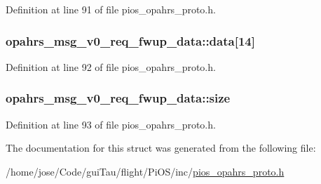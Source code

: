 Definition at line 91 of file pios\-\_\-opahrs\-\_\-proto.\-h.

\hypertarget{structopahrs__msg__v0__req__fwup__data_aed597f47669351e5b689a79755b1f152}{
\subsubsection[{data}]{ opahrs\-\_\-msg\-\_\-v0\-\_\-req\-\_\-fwup\-\_\-data\-::data\mbox{[}14\mbox{]}}}\label{structopahrs__msg__v0__req__fwup__data_aed597f47669351e5b689a79755b1f152}


Definition at line 92 of file pios\-\_\-opahrs\-\_\-proto.\-h.

\hypertarget{structopahrs__msg__v0__req__fwup__data_a64e3045d330fdaa9b0931dea2e7e0e4a}{
\subsubsection[{size}]{ opahrs\-\_\-msg\-\_\-v0\-\_\-req\-\_\-fwup\-\_\-data\-::size}}\label{structopahrs__msg__v0__req__fwup__data_a64e3045d330fdaa9b0931dea2e7e0e4a}


Definition at line 93 of file pios\-\_\-opahrs\-\_\-proto.\-h.



The documentation for this struct was generated from the following file\-:\begin{DoxyCompactItemize}
\item 
/home/jose/\-Code/gui\-Tau/flight/\-Pi\-O\-S/inc/\hyperlink{pios__opahrs__proto_8h}{pios\-\_\-opahrs\-\_\-proto.\-h}\end{DoxyCompactItemize}

